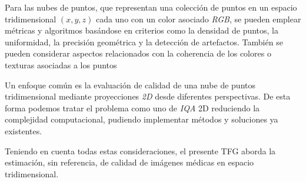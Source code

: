 Para las nubes de puntos, que representan una colección de puntos en un espacio 
tridimensional $(x,y,z)$ cada uno con un color asociado \emph{RGB}, se pueden emplear métricas y algoritmos basándose en criterios como la 
densidad de puntos, la uniformidad, la precisión geométrica y la detección de artefactos.
También se pueden considerar aspectos relacionados con la coherencia de los colores 
o texturas asociadas a los puntos\cite{NR3DQA, StructureGuidedResampling, GPA-NET} 
 
Un enfoque común es la evaluación de calidad de una nube de puntos tridimensional 
mediante proyecciones \emph{2D} desde diferentes perspectivas\cite{IT-PCQA, VQA-PC, MM-PCQA}. 
De esta forma podemos tratar el problema como uno de \emph{IQA} 2D reduciendo la 
complejidad computacional, pudiendo implementar métodos y soluciones ya existentes.

Teniendo en cuenta todas estas consideraciones, el presente TFG aborda la
estimación, sin referencia, de calidad de imágenes médicas en espacio tridimensional.

